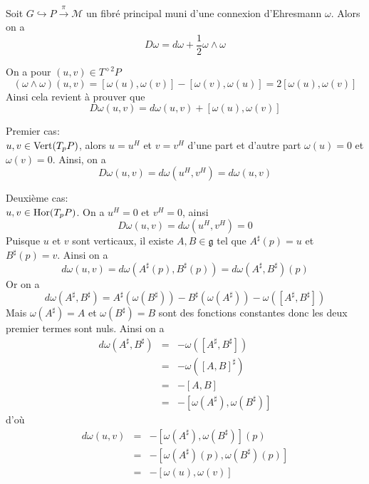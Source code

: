 \documentclass[12pt, a4paper]{book}
\begin{document}
\begin{pro}
Soit $G \hookrightarrow P \overset{\pi}{\to} \mathcal{M}$ un fibré principal muni d'une connexion d'Ehresmann $\omega$. Alors on a 
$$D\omega = d\omega + \frac{1}{2}\omega\wedge\omega$$
\end{pro}
\begin{preu}
On a pour $(u,v)\in T^{\diamond 2}P$
$$(\omega \wedge \omega) (u, v) = [\omega(u), \omega(v)] - [\omega(v), \omega(u)] = 2[\omega(u), \omega(v)]$$
Ainsi cela revient à prouver que 
$$D\omega(u, v) = d\omega(u, v) + [\omega(u), \omega(v)]$$

Premier cas: \\
$u,v\in \operatorname{Vert}(T_pP)$, alors $u = u^H$ et $v = v^H$ d'une part et d'autre part $\omega(u) = 0$ et $\omega(v) = 0$. Ainsi, on a
$$D\omega(u, v) = d\omega(u^H, v^H) = d\omega(u, v)$$

Deuxième cas:\\
$u, v \in \operatorname{Hor}(T_pP)$. On a $u^H = 0$ et $v^H = 0$, ainsi 
$$D\omega(u,v) = d\omega(u^H, v^H) = 0$$ 
Puisque $u$ et $v$ sont verticaux, il existe $A, B\in \mathfrak{g}$ tel que $A^\sharp(p) = u$ et $B^\sharp(p) = v$. Ainsi on a
$$d\omega(u, v) = d\omega(A^\sharp(p), B^\sharp(p)) = d\omega(A^\sharp, B^\sharp)(p)$$
Or on a 
$$d\omega(A^\sharp, B^\sharp) = A^\sharp(\omega(B^\sharp)) - B^\sharp(\omega(A^\sharp)) - \omega([A^\sharp, B^\sharp])$$
Mais $\omega(A^\sharp) = A$ et $\omega(B^\sharp) = B$ sont des fonctions constantes donc les deux premier termes sont nuls. Ainsi on a
\begin{eqnarray*}
d\omega(A^\sharp, B^\sharp) &=& -\omega([A^\sharp, B^\sharp]) \\
 & = & -\omega([A, B]^\sharp) \\
 & = & -[A,B] \\
 & = & -[\omega(A^\sharp), \omega(B^\sharp)]
\end{eqnarray*}
d'où
\begin{eqnarray*}
d\omega(u, v) &=& -[\omega(A^\sharp), \omega(B^\sharp)](p) \\
 & = & -[\omega(A^\sharp)(p), \omega(B^\sharp)(p)] \\
 & = & -[\omega(u), \omega(v)]
\end{eqnarray*}


\end{preu}
\end{document}
